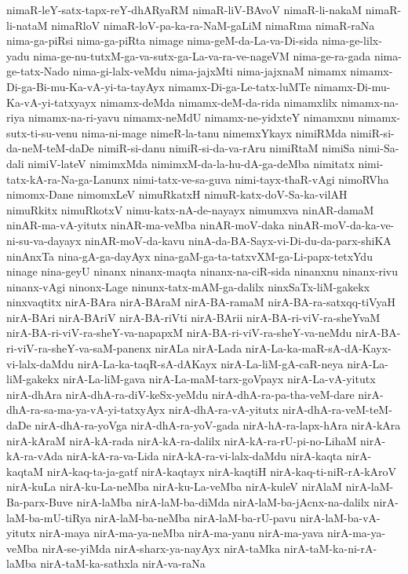 {nimaR-leY-satx-tapx-reY-dhARyaRM
nimaR-liV-BAvoV
nimaR-li-nakaM
nimaR-li-nataM
nimaRloV
nimaR-loV-pa-ka-ra-NaM-gaLiM
nimaRma
nimaR-raNa
nima-ga-piRsi
nima-ga-piRta
nimage
nima-geM-da-La-va-Di-sida
nima-ge-lilx-yadu
nima-ge-nu-tutxM-ga-va-sutx-ga-La-va-ra-ve-nageVM
nima-ge-ra-gada
nima-ge-tatx-Nado
nima-gi-lalx-veMdu
nima-jajxMti
nima-jajxnaM
nimamx
nimamx-Di-ga-Bi-mu-Ka-vA-yi-ta-tayAyx
nimamx-Di-ga-Le-tatx-luMTe
nimamx-Di-mu-Ka-vA-yi-tatxyayx
nimamx-deMda
nimamx-deM-da-rida
nimamxlilx
nimamx-na-riya
nimamx-na-ri-yavu
nimamx-neMdU
nimamx-ne-yidxteY
nimamxnu
nimamx-sutx-ti-su-venu
nima-ni-mage
nimeR-la-tanu
nimemxYkayx
nimiRMda
nimiR-si-da-neM-teM-daDe
nimiR-si-danu
nimiR-si-da-va-rAru
nimiRtaM
nimiSa
nimi-Sa-dali
nimiV-lateV
nimimxMda
nimimxM-da-la-hu-dA-ga-deMba
nimitatx
nimi-tatx-kA-ra-Na-ga-Lanunx
nimi-tatx-ve-sa-guva
nimi-tayx-thaR-vAgi
nimoRVha
nimomx-Dane
nimomxLeV
nimuRkatxH
nimuR-katx-doV-Sa-ka-vilAH
nimuRkitx
nimuRkotxV
nimu-katx-nA-de-nayayx
nimumxva
ninAR-damaM
ninAR-ma-vA-yitutx
ninAR-ma-veMba
ninAR-moV-daka
ninAR-moV-da-ka-ve-ni-su-va-dayayx
ninAR-moV-da-kavu
ninA-da-BA-Sayx-vi-Di-du-da-parx-shiKA
ninAnxTa
nina-gA-ga-dayAyx
nina-gaM-ga-ta-tatxvXM-ga-Li-papx-tetxYdu
ninage
nina-geyU
ninanx
ninanx-maqta
ninanx-na-ciR-sida
ninanxnu
ninanx-rivu
ninanx-vAgi
ninonx-Lage
ninunx-tatx-mAM-ga-dalilx
ninxSaTx-liM-gakekx
ninxvaqtitx
nirA-BAra
nirA-BAraM
nirA-BA-ramaM
nirA-BA-ra-satxqq-tiVyaH
nirA-BAri
nirA-BAriV
nirA-BA-riVti
nirA-BArii
nirA-BA-ri-viV-ra-sheYvaM
nirA-BA-ri-viV-ra-sheY-va-napapxM
nirA-BA-ri-viV-ra-sheY-va-neMdu
nirA-BA-ri-viV-ra-sheY-va-saM-panenx
nirALa
nirA-Lada
nirA-La-ka-maR-sA-dA-Kayx-vi-lalx-daMdu
nirA-La-ka-taqR-sA-dAKayx
nirA-La-liM-gA-caR-neya
nirA-La-liM-gakekx
nirA-La-liM-gava
nirA-La-maM-tarx-goVpayx
nirA-La-vA-yitutx
nirA-dhAra
nirA-dhA-ra-diV-keSx-yeMdu
nirA-dhA-ra-pa-tha-veM-dare
nirA-dhA-ra-sa-ma-ya-vA-yi-tatxyAyx
nirA-dhA-ra-vA-yitutx
nirA-dhA-ra-veM-teM-daDe
nirA-dhA-ra-yoVga
nirA-dhA-ra-yoV-gada
nirA-hA-ra-lapx-hAra
nirA-kAra
nirA-kAraM
nirA-kA-rada
nirA-kA-ra-dalilx
nirA-kA-ra-rU-pi-no-LihaM
nirA-kA-ra-vAda
nirA-kA-ra-va-Lida
nirA-kA-ra-vi-lalx-daMdu
nirA-kaqta
nirA-kaqtaM
nirA-kaq-ta-ja-gatf
nirA-kaqtayx
nirA-kaqtiH
nirA-kaq-ti-niR-rA-kAroV
nirA-kuLa
nirA-ku-La-neMba
nirA-ku-La-veMba
nirA-kuleV
nirAlaM
nirA-laM-Ba-parx-Buve
nirA-laMba
nirA-laM-ba-diMda
nirA-laM-ba-jAcnx-na-dalilx
nirA-laM-ba-mU-tiRya
nirA-laM-ba-neMba
nirA-laM-ba-rU-pavu
nirA-laM-ba-vA-yitutx
nirA-maya
nirA-ma-ya-neMba
nirA-ma-yanu
nirA-ma-yava
nirA-ma-ya-veMba
nirA-se-yiMda
nirA-sharx-ya-nayAyx
nirA-taMka
nirA-taM-ka-ni-rA-laMba
nirA-taM-ka-sathxla
nirA-va-raNa
}
